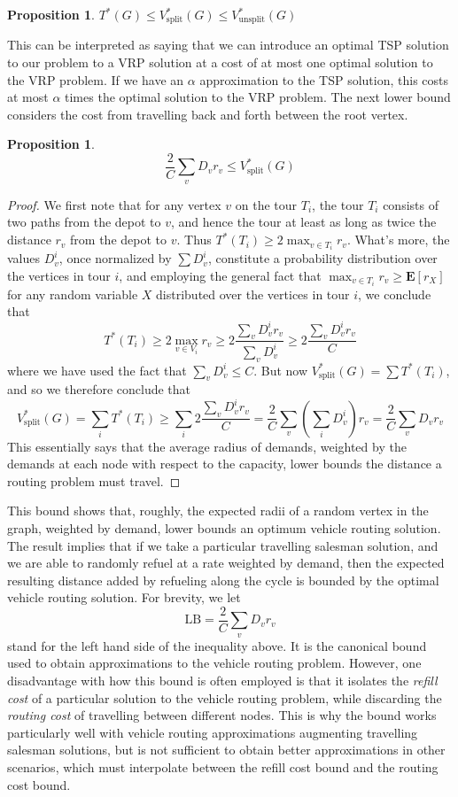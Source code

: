 \documentclass{article}
\theoremstyle{plain}
\newtheorem{proposition}[theorem]{Proposition}
\newcommand{\VRPsplit}[1]{V^*_{\text{split}}( #1 )}
\newcommand{\VRPunsplit}[1]{V^*_{\text{unsplit}}( #1 )}
\begin{document}
\begin{proposition}
$T^*(G) \leq \VRPsplit{G} \leq \VRPunsplit{G}$
\end{proposition}

This can be interpreted as saying that we can introduce an optimal TSP solution to our problem to a VRP solution at a cost of at most one optimal solution to the VRP problem. If we have an $\alpha$ approximation to the TSP solution, this costs at most $\alpha$ times the optimal solution to the VRP problem. The next lower bound considers the cost from travelling back and forth between the root vertex.

\begin{proposition}
%
\[ \frac{2}{C} \sum_v D_v r_v \leq \VRPsplit{G} \]
\end{proposition}
\begin{proof}
    We first note that for any vertex $v$ on the tour $T_i$, the tour $T_i$ consists of two paths from the depot to $v$, and hence the tour at least as long as twice the distance $r_v$ from the depot to $v$. Thus $T^*(T_i) \geq 2 \max_{v \in T_i} r_v$. What's more, the values $D^i_v$, once normalized by $\sum D^i_v$, constitute a probability distribution over the vertices in tour $i$, and employing the general fact that $\max_{v \in T_i} r_v \geq \mathbf{E}[r_X]$ for any random variable $X$ distributed over the vertices in tour $i$, we conclude that
    \[ T^*(T_i) \geq 2 \max_{v \in V_i} r_v \geq 2 \frac{\sum_v D^i_v r_v}{\sum_v D^i_v} \geq 2 \frac{\sum_v D^i_v r_v}{C} \]
    where we have used the fact that $\sum_v D^i_v \leq C$. But now $\VRPsplit{G} = \sum T^*(T_i)$, and so we therefore conclude that
    \[ \VRPsplit{G} = \sum_i T^*(T_i) \geq \sum_i 2 \frac{\sum_v D^i_v r_v}{C} = \frac{2}{C} \sum_v \left( \sum_i D^i_v \right) r_v = \frac{2}{C} \sum_v D_v r_v \]
    This essentially says that the average radius of demands, weighted by the demands at each node with respect to the capacity, lower bounds the distance a routing problem must travel.
\end{proof}

This bound shows that, roughly, the expected radii of a random vertex in the graph, weighted by demand, lower bounds an optimum vehicle routing solution. The result implies that if we take a particular travelling salesman solution, and we are able to randomly refuel at a rate weighted by demand, then the expected resulting distance added by refueling along the cycle is bounded by the optimal vehicle routing solution. For brevity, we let
%
\[ \text{LB} = \frac{2}{C} \sum_v D_v r_v \]
%
stand for the left hand side of the inequality above. It is the canonical bound used to obtain approximations to the vehicle routing problem. However, one disadvantage with how this bound is often employed is that it isolates the {\it refill cost} of a particular solution to the vehicle routing problem, while discarding the {\it routing cost} of travelling between different nodes. This is why the bound works particularly well with vehicle routing approximations augmenting travelling salesman solutions, but is not sufficient to obtain better approximations in other scenarios, which must interpolate between the refill cost bound and the routing cost bound.
\end{document}
